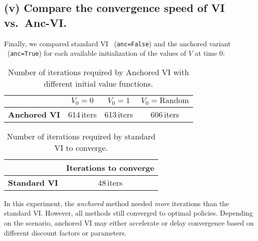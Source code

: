 \subsection*{(v) Compare the convergence speed of VI vs.\ Anc-VI.}

\noindent
Finally, we compared standard VI \ (\texttt{anc=False}) and the anchored variant 
\ (\texttt{anc=True}) for each available initialization of the values of $V$ at time $0$:
\begin{table}[h!]
  \centering
  \begin{tabular}{l|c|c|c}
  \hline
   & \textbf{$V_0 = 0$} & \textbf{$V_0 = 1$} & \textbf{$V_0 = \mathrm{Random}$} \\
  \hline
  \textbf{Anchored VI} & 614\,iters & 613\,iters & 606\,iters \\
  \hline
  \end{tabular}
  \caption{Number of iterations required by Anchored VI with different initial value functions.}
  \label{tab:anchored-vi}
\end{table}
\begin{table}[h!]
  \centering
  \begin{tabular}{l|c}
  \hline
   & \textbf{Iterations to converge} \\
  \hline
  \textbf{Standard VI} & 48\,iters \\
  \hline
  \end{tabular}
  \caption{Number of iterations required by standard VI to converge.}
  \label{tab:standard-vi}
\end{table}
In this experiment, the \emph{anchored} method needed \emph{more} iterations 
than the standard VI.
However, all methods still converged to optimal policies. Depending on the scenario,
anchored VI may either accelerate or delay convergence based on different discount factors or parameters.